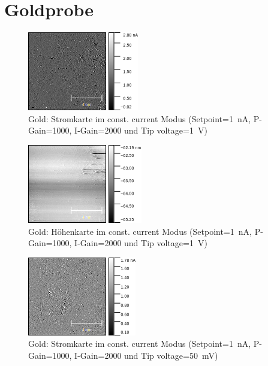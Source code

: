 \documentclass[sn-mathphys-num,iicol]{sn-jnl}
\theoremstyle{thmstyleone}
\theoremstyle{thmstyletwo}
\theoremstyle{thmstylethree}
\begin{document}
\section{Goldprobe}
\begin{figure}[h]
        \centering
        \includegraphics[width=.5\textwidth]{../data/Gold_10nm_current.png}
        \caption{Gold: Stromkarte im const. current Modus (Setpoint=\SI{1}{\nano A}, P-Gain=\SI{1000}{}, I-Gain=\SI{2000}{} und Tip voltage=\SI{1}{V})} \label{fig:g10nmc}
\end{figure}
\begin{figure}[h]
        \centering
        \includegraphics[width=.5\textwidth]{../data/Gold_10nm_z.png}
        \caption{Gold: Höhenkarte im const. current Modus (Setpoint=\SI{1}{\nano A}, P-Gain=\SI{1000}{}, I-Gain=\SI{2000}{} und Tip voltage=\SI{1}{V})} \label{fig:g10nmz}
\end{figure}
\begin{figure}[h]
        \centering
        \includegraphics[width=.5\textwidth]{../data/Gold_10nm_50mV_current.png}
        \caption{Gold: Stromkarte im const. current Modus (Setpoint=\SI{1}{\nano A}, P-Gain=\SI{1000}{}, I-Gain=\SI{2000}{} und Tip voltage=\SI{50}{\milli V})} \label{fig:g10nm50mVc}
\end{figure}
\end{document}
